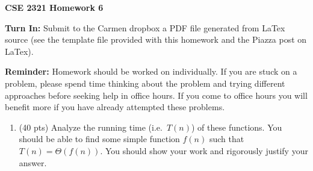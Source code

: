 \documentclass[14pt]{extarticle}
\newcommand\tab[1][1cm]{\hspace*{#1}}
\begin{document}
\textbf{CSE 2321 Homework 6}

\textbf{Turn In:} Submit to the Carmen dropbox a PDF file generated from LaTex source (see the template file provided with this homework and the Piazza post on LaTex).

\textbf{Reminder:} Homework should be worked on individually. If you are stuck on a problem, please spend time thinking about the problem and trying different approaches before seeking help in office hours. If you come to office hours you will benefit more if you have already attempted these problems. 

\begin{enumerate}
\item (40 pts) Analyze the running time (i.e.~$T(n)$) of these functions. You should be able to find some simple function $f(n)$ such that $T(n) = \Theta(f(n))$. You should show your work and rigorously justify your answer.
\begin{enumerate}

\end{enumerate}
\end{enumerate}
\end{document}
